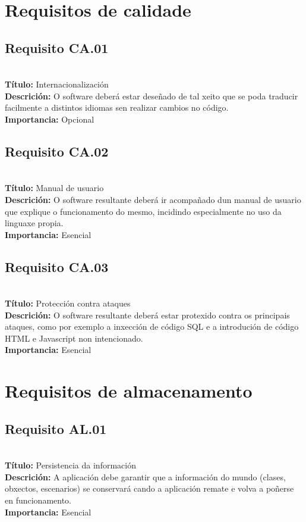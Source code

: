 \section{Requisitos de calidade}
\subsection{Requisito CA.01}~\\
{\bf Título:} Internacionalización\\
{\bf Descrición:} O software deberá estar deseñado de tal xeito que se poda
traducir facilmente a distintos idiomas sen realizar cambios no código.\\
{\bf Importancia:} Opcional

\subsection{Requisito CA.02}~\\
{\bf Título:} Manual de usuario\\
{\bf Descrición:} O software resultante deberá ir acompañado dun manual de
usuario que explique o funcionamento do mesmo, incidindo especialmente no uso
da linguaxe propia.\\
{\bf Importancia:} Esencial

\subsection{Requisito CA.03}~\\
{\bf Título:} Protección contra ataques\\
{\bf Descrición:} O software resultante deberá estar protexido contra os
principais ataques, como por exemplo a inxección de código SQL e a introdución
de código HTML e Javascript non intencionado.\\
{\bf Importancia:} Esencial

\section{Requisitos de almacenamento}
\subsection{Requisito AL.01}~\\
{\bf Título:} Persistencia da información\\
{\bf Descrición:} A aplicación debe garantir que a información do mundo
(clases, obxectos, escenarios) se conservará cando a aplicación remate e volva a
poñerse en funcionamento.\\
{\bf Importancia:} Esencial
